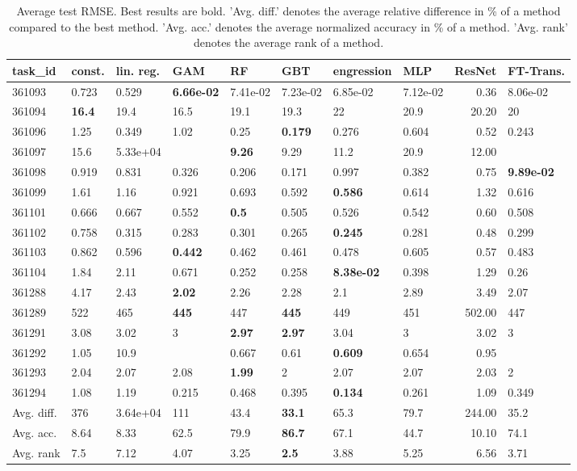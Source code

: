 \begin{table}[ht!]
\centering
\begingroup\footnotesize
\begin{tabular}{llllllllrl}
  \hline
\hline
task\_id & const. & lin. reg. & GAM & RF & GBT & engression & MLP & ResNet & FT-Trans. \\ 
  \hline
361093 & 0.723 & 0.529 & \textbf{6.66e-02} & 7.41e-02 & 7.23e-02 & 6.85e-02 & 7.12e-02 & 0.36 & 8.06e-02 \\ 
  361094 & \textbf{16.4} & 19.4 & 16.5 & 19.1 & 19.3 & 22 & 20.9 & 20.20 & 20 \\ 
  361096 & 1.25 & 0.349 & 1.02 & 0.25 & \textbf{0.179} & 0.276 & 0.604 & 0.52 & 0.243 \\ 
  361097 & 15.6 & 5.33e+04 &  & \textbf{9.26} & 9.29 & 11.2 & 20.9 & 12.00 &  \\ 
  361098 & 0.919 & 0.831 & 0.326 & 0.206 & 0.171 & 0.997 & 0.382 & 0.75 & \textbf{9.89e-02} \\ 
  361099 & 1.61 & 1.16 & 0.921 & 0.693 & 0.592 & \textbf{0.586} & 0.614 & 1.32 & 0.616 \\ 
  361101 & 0.666 & 0.667 & 0.552 & \textbf{0.5} & 0.505 & 0.526 & 0.542 & 0.60 & 0.508 \\ 
  361102 & 0.758 & 0.315 & 0.283 & 0.301 & 0.265 & \textbf{0.245} & 0.281 & 0.48 & 0.299 \\ 
  361103 & 0.862 & 0.596 & \textbf{0.442} & 0.462 & 0.461 & 0.478 & 0.605 & 0.57 & 0.483 \\ 
  361104 & 1.84 & 2.11 & 0.671 & 0.252 & 0.258 & \textbf{8.38e-02} & 0.398 & 1.29 & 0.26 \\ 
  361288 & 4.17 & 2.43 & \textbf{2.02} & 2.26 & 2.28 & 2.1 & 2.89 & 3.49 & 2.07 \\ 
  361289 & 522 & 465 & \textbf{445} & 447 & \textbf{445} & 449 & 451 & 502.00 & 447 \\ 
  361291 & 3.08 & 3.02 & 3 & \textbf{2.97} & \textbf{2.97} & 3.04 & 3 & 3.02 & 3 \\ 
  361292 & 1.05 & 10.9 &  & 0.667 & 0.61 & \textbf{0.609} & 0.654 & 0.95 &  \\ 
  361293 & 2.04 & 2.07 & 2.08 & \textbf{1.99} & 2 & 2.07 & 2.07 & 2.03 & 2 \\ 
  361294 & 1.08 & 1.19 & 0.215 & 0.468 & 0.395 & \textbf{0.134} & 0.261 & 1.09 & 0.349 \\ 
   \hline
Avg. diff. & 376 & 3.64e+04 & 111 & 43.4 & \textbf{33.1} & 65.3 & 79.7 & 244.00 & 35.2 \\ 
  Avg. acc. & 8.64 & 8.33 & 62.5 & 79.9 & \textbf{86.7} & 67.1 & 44.7 & 10.10 & 74.1 \\ 
  Avg. rank & 7.5 & 7.12 & 4.07 & 3.25 & \textbf{2.5} & 3.88 & 5.25 & 6.56 & 3.71 \\ 
   \hline
\hline
\end{tabular}
\endgroup
\caption{Average test RMSE. 
                  Best results are bold. 
                  'Avg. diff.' denotes the average relative difference in \% of a method compared to the best method.
                  'Avg. acc.' denotes the average normalized accuracy in \% of a method.
                  'Avg. rank' denotes the average rank of a method.} 
\label{TABLES/table_results_RMSE_gower}
\end{table}
